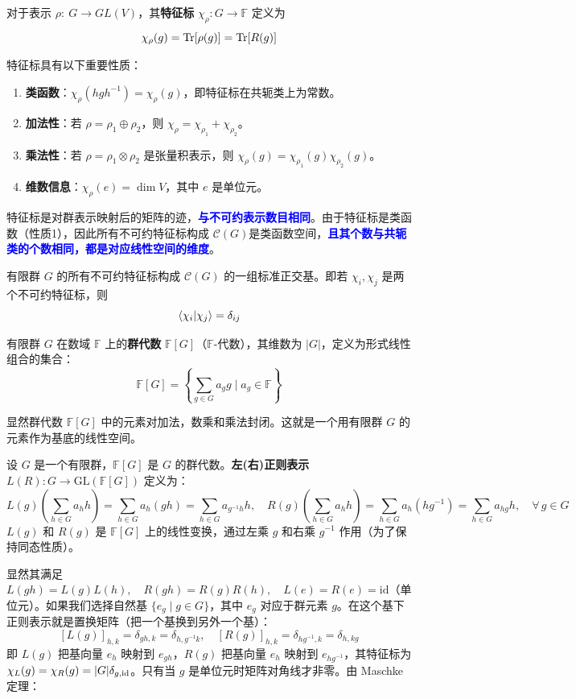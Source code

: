\begin{definition}[特征标]\label{def:x}
对于表示 $\rho: \ G \to GL(V)$，其\textbf{特征标} $\chi_\rho: G \to \mathbb{F}$ 定义为
\[\chi_\rho(g) = \Tr[\rho(g)]=\Tr[R(g)]\]
\end{definition}
特征标具有以下重要性质：
\begin{enumerate}
\item \textbf{类函数}：$\chi_\rho(h g h^{-1}) = \chi_\rho(g)$，即特征标在共轭类上为常数。
\item \textbf{加法性}：若 $\rho = \rho_1 \oplus \rho_2$，则 $\chi_\rho = \chi_{\rho_1} + \chi_{\rho_2}$。
\item \textbf{乘法性}：若 $\rho = \rho_1 \otimes \rho_2$ 是张量积表示，则 $\chi_\rho(g) = \chi_{\rho_1}(g) \chi_{\rho_2}(g)$。
\item \textbf{维数信息}：$\chi_\rho(e) = \dim V$，其中 $e$ 是单位元。
\end{enumerate}
特征标是对群表示映射后的矩阵的迹，\textcolor{blue}{\textbf{与不可约表示数目相同}}。由于特征标是类函数（性质1），因此所有不可约特征标构成 $\mathcal{C}(G)$是类函数空间，\textcolor{blue}{\textbf{且其个数与共轭类的个数相同，都是对应线性空间的维度}}。
\begin{theorem}[正交定理]
有限群 $G$ 的所有不可约特征标构成 $\mathcal{C}(G)$ 的一组标准正交基。即若 $\chi_i, \chi_j$ 是两个不可约特征标，则
\[\bra{\chi_i}\ket{\chi_j} = \delta_{ij}\] 
\end{theorem}

\begin{definition}[群代数]
有限群 $G$ 在数域 $\mathbb{F}$ 上的\textbf{群代数} $\mathbb{F}[G]$（$\mathbb{F}$-代数），其维数为 $|G|$，定义为形式线性组合的集合：
\[\mathbb{F}[G] = \left\{ \sum_{g \in G} a_g g \mid a_g \in \mathbb{F} \right\}\]
\end{definition}
显然群代数 $\mathbb{F}[G]$ 中的元素对加法，数乘和乘法封闭。这就是一个用有限群 $G$ 的元素作为基底的线性空间。

\begin{definition}[左(右)正则表示]
设 $G$ 是一个有限群，$\mathbb{F}[G]$ 是 $G$ 的群代数。\textbf{左(右)正则表示} $L(R): G \to \mathrm{GL}(\mathbb{F}[G])$ 定义为：
\[L(g) \left( \sum_{h \in G} a_h h \right) = \sum_{h \in G} a_h (gh) = \sum_{h \in G} a_{g^{-1}h} h, \quad R(g) \left( \sum_{h \in G} a_h h \right) = \sum_{h \in G} a_h (hg^{-1}) = \sum_{h \in G} a_{hg} h, \quad \forall \, g \in G\]
$L(g)$ 和 $R(g)$ 是 $\mathbb{F}[G]$ 上的线性变换，通过左乘 $g$ 和右乘 $g^{-1}$ 作用（为了保持同态性质）。
\end{definition}
显然其满足$L(gh) = L(g)L(h), \quad R(gh) = R(g)R(h), \quad L(e) = R(e) = \mathrm{id}$（单位元）。如果我们选择自然基 $\{e_g \mid g \in G\}$，其中 $e_g$ 对应于群元素 $g$。在这个基下正则表示就是置换矩阵（把一个基换到另外一个基）：
\[[L(g)]_{h,k} = \delta_{g h, k} = \delta_{h, g^{-1} k}, \quad [R(g)]_{h,k} = \delta_{h g^{-1}, k} = \delta_{h, k g}\]
即 $L(g)$ 把基向量 $e_h$ 映射到 $e_{gh}$，$R(g)$ 把基向量 $e_h$ 映射到 $e_{hg^{-1}}$，其特征标为$\chi_{L}(g) = \chi_{R}(g) = |G|\delta_{g,\rm{id}}$。只有当 $g$ 是单位元时矩阵对角线才非零。由 Maschke 定理：

